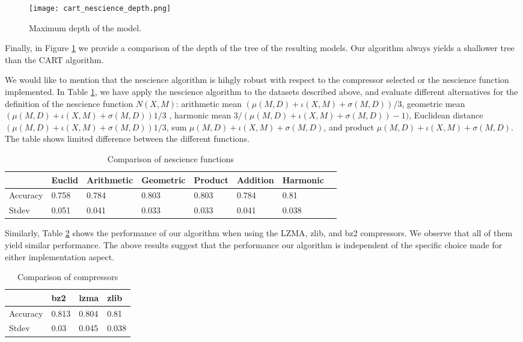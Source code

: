 \begin{figure}[h]
\centering
\texttt{[image: cart\_nescience\_depth.png]}
\caption{Maximum depth of the model.}
\label{figure:cart_nescience_depth}
\end{figure}

Finally, in Figure \ref{figure:cart_nescience_depth} we provide a comparison of the depth of the tree of the resulting models. Our algorithm always yields a shallower tree than the CART algorithm.

We would like to mention that the nescience algorithm is hihgly robust with respect to the compressor selected or the nescience function implemented. In Table \ref{table:nescience_functions}, we have apply the nescience algorithm to the datasets described above, and evaluate different alternatives for the definition of the nescience function $N (X , M )$: arithmetic mean $(\mu(M , D) + \iota(X , M ) + \sigma(M, D))/3$, geometric mean $(\mu(M , D) + \iota(X , M ) + \sigma(M, D)) 1/3$ , harmonic mean $3 / (\mu(M , D) + \iota(X , M ) + \sigma(M, D)) -1 )$, Euclidean distance $(\mu(M , D) + \iota(X , M ) + \sigma(M, D)) 1/3$, sum $\mu(M , D) + \iota(X , M ) + \sigma(M, D)$, and product $\mu(M , D) + \iota(X , M ) + \sigma(M, D)$. The table shows limited difference between the different functions. 

\begin{table}[h]
\label{table:nescience_functions}
\centering
\begin{tabular}{l l l l l l l l}
\toprule
 & \textbf{Euclid} & \textbf{Arithmetic} & \textbf{Geometric} & \textbf{Product} & \textbf{Addition} & \textbf{Harmonic} \\
\midrule
Accuracy & 0.758 & 0.784 & 0.803 & 0.803 & 0.784 & 0.81 \\
Stdev & 0.051 & 0.041 & 0.033 & 0.033 & 0.041 & 0.038 \\
\bottomrule
\end{tabular}
\caption{Comparison of nescience functions}
\end{table}

Similarly, Table \ref{table:compressor} shows the performance of our algorithm when using the LZMA, zlib, and bz2 compressors. We observe that all of them yield similar performance. The above results suggest that the performance our algorithm is independent of the specific choice made for either implementation aspect.

\begin{table}[h]
\label{table:compressor}
\centering
\begin{tabular}{l l l l}
\toprule
 & \textbf{bz2} & \textbf{lzma} & \textbf{zlib} \\
\midrule
Accuracy & 0.813 & 0.804 & 0.81 \\
Stdev & 0.03 & 0.045 & 0.038 \\
\bottomrule
\end{tabular}
\caption{Comparison of compressors}
\end{table}

